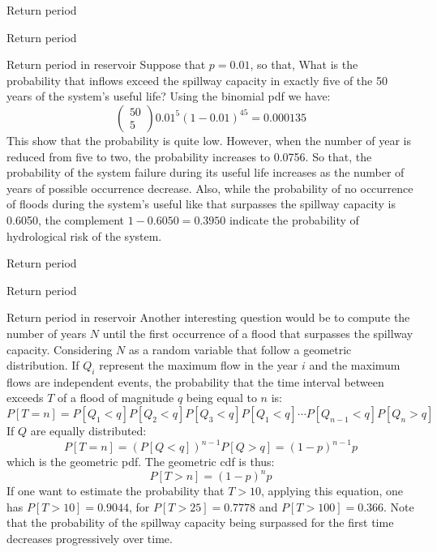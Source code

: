 \documentclass[8pt]{beamer}
\renewcommand{\emph}[1]{\textcolor{myorange}{#1}}
\begin{document}
\begin{frame}{Return period}
    \begin{block}{Return period}
 \begin{exampleblock}{Return period in reservoir} %
       Suppose that $p=0.01$, so that, What is the probability that inflows exceed the spillway capacity in exactly five of the 50 years of the system’s useful life? Using the binomial \emph{pdf} we have:
     \[
         \left( \begin{array}{c} 50 \\ 5 \end{array} \right) 0.01^5 (1-0.01)^{45} = 0.000135
     \]
     This show that the probability is quite low. However, when the number of year is reduced from five to two, the probability increases to 0.0756. So that, the probability of the system failure during its useful life increases as the number of years of possible occurrence decrease. Also, while the probability of no occurrence of floods during the system's useful like that surpasses the spillway capacity is 0.6050, the complement $1-0.6050 = 0.3950$ indicate the probability of hydrological risk of the system. 
 \end{exampleblock}
    \end{block}
\end{frame}

\begin{frame}{Return period}
    \begin{block}{Return period}
 \begin{exampleblock}{Return period in reservoir} %
    Another interesting question would be to compute the number of years $N$ until the first occurrence of a flood that surpasses the spillway capacity. Considering $N$ as a random variable that follow a \emph{geometric distribution}. If $Q_i$ represent the maximum flow in the year $i$ and the maximum flows are independent events, the probability that the time interval between exceeds $T$ of a flood of magnitude $q$ being equal to $n$ is:
     \[
         P[T= n] = P[Q_1 < q]P[Q_2 < q]P[Q_3 < q]P[Q_1 < q] \cdots P[Q_{n-1} < q] P[Q_n > q]
     \]
     If $Q$ are equally distributed:
     \[
         P[T= n] = \left( P[Q < q] \right)^{n-1} P[Q > q] = (1-p)^{n-1} p
     \]
     which is the \emph{geometric pdf}. The \emph{geometric cdf} is thus:
     \[
         P[T > n] =  (1-p)^{n} p
     \]
     If one want to estimate the probability that $T>10$, applying this equation, one has $P[T>10] = 0.9044$, for $P[T>25] = 0.7778$ and $P[T>100] = 0.366$. Note that the probability of the spillway capacity being surpassed for the first time decreases progressively over time.
 \end{exampleblock}
    \end{block}
\end{frame}
\end{document}
